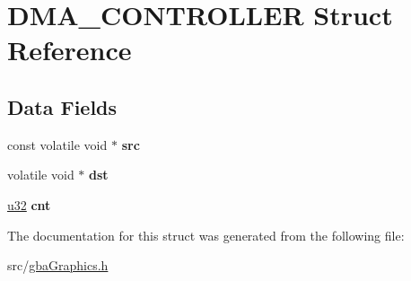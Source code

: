 \hypertarget{struct_d_m_a___c_o_n_t_r_o_l_l_e_r}{}\section{D\+M\+A\+\_\+\+C\+O\+N\+T\+R\+O\+L\+L\+ER Struct Reference}
\label{struct_d_m_a___c_o_n_t_r_o_l_l_e_r}
\subsection*{Data Fields}
\begin{DoxyCompactItemize}
\item 
const volatile void $\ast$ {\bfseries src}\hypertarget{struct_d_m_a___c_o_n_t_r_o_l_l_e_r_a8635df590f3be8660baf434e9dd089c0}{}\label{struct_d_m_a___c_o_n_t_r_o_l_l_e_r_a8635df590f3be8660baf434e9dd089c0}

\item 
volatile void $\ast$ {\bfseries dst}\hypertarget{struct_d_m_a___c_o_n_t_r_o_l_l_e_r_a10bb8d4aba0026759369b4cf877f2d84}{}\label{struct_d_m_a___c_o_n_t_r_o_l_l_e_r_a10bb8d4aba0026759369b4cf877f2d84}

\item 
\hyperlink{my_lib_8h_a10e94b422ef0c20dcdec20d31a1f5049}{u32} {\bfseries cnt}\hypertarget{struct_d_m_a___c_o_n_t_r_o_l_l_e_r_a7a0474bcceca8aec71d5fdc392a2c11d}{}\label{struct_d_m_a___c_o_n_t_r_o_l_l_e_r_a7a0474bcceca8aec71d5fdc392a2c11d}

\end{DoxyCompactItemize}


The documentation for this struct was generated from the following file\+:\begin{DoxyCompactItemize}
\item 
src/\hyperlink{gba_graphics_8h}{gba\+Graphics.\+h}\end{DoxyCompactItemize}

